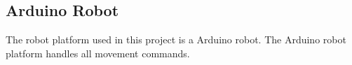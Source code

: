 \subsection{Arduino Robot}
The robot platform used in this project is a Arduino robot\cite{ArduinoRobot}. The Arduino robot platform handles all movement commands.

 
